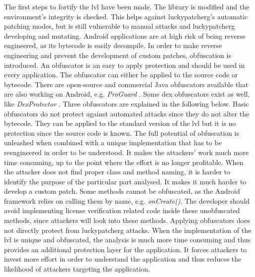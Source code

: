 The first steps to fortify the \gls{lvl} have been made.
The library is modified and the environment's integrity is checked.
This helps against \gls{luckypatcherg}’s automatic patching modes, but is still vulnerable to manual attacks and \gls{luckypatcherg} developing and mutating.
Android applications are at high risk of being reverse engineered, as its bytecode is easily decompile.
In order to make reverse engineering and prevent the development of custom patches, obfuscation is introduced.
\newline
An obfuscator is an easy to apply protection and should be used in every application.
The obfuscator can either be applied to the source code or bytecode.
There are open-source and commercial Java obfuscators available that are also working on Android, e.g. \textit{ProGuard} \cite{proguard}.
Some dex obfuscators exist as well, like \textit{DexProtector} \cite{dexProtector}.
Three obfuscators are explained in the following below.
\newline
Basic obfuscators do not protect against automated attacks since they do not alter the bytecode.
They can be applied to the standard version of the \gls{lvl} but it is no protection since the source code is known.
The full potential of obfuscation is unleashed when combined with a unique implementation that has to be reengineered in order to be understood.
It makes the attackers’ work much more time consuming, up to the point where the effort is no longer profitable.
When the attacker does not find proper class and method naming, it is harder to identify the purpose of the particular part analysed.
It makes it much harder to develop a custom patch. \cite{developersSecuring}
\newline
Some methods cannot be obfuscated, as the Android framework relies on calling them by name, e.g. \textit{onCreate()}.
The developer should avoid implementing license verification related code inside these unobfuscated methods, since attackers will look into these methods.
\cite{developersSecuring}
\newline
\newline
Applying obfuscators does not directly protect from \gls{luckypatcherg} attacks.
When the implementation of the \gls{lvl} is unique and obfuscated, the analysis is much more time consuming and thus provides an additional protection layer for the application.
It forces attackers to invest more effort in order to understand the application and thus reduces the likelihood of attackers targeting the application.
